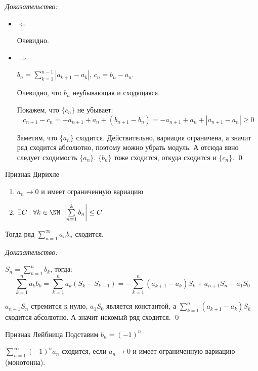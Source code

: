 \textit{Доказательство:}

\begin{itemize}
    \item
        \( \Leftarrow \)

        Очевидно.
    \item
        \( \Rightarrow \)

        \( b_n = \sum\limits_{k = 1}^{n - 1} | a_{k + 1} - a_k | \), \( c_n = b_n - a_n \).

        Очевидно, что \( b_n \) неубывающая и сходящаяся.

        Покажем, что \( \{ c_n \} \) не убывает:
        \[
            c_{n + 1} - c_n = -a_{n + 1} + a_n + (b_{n + 1} - b_n)
            =
            -a_{n + 1} + a_n + | a_{n + 1} - a_n | \geq 0
        \]

        Заметим, что \( \{ a_n \} \) сходится.
        Действительно, вариация ограничена, а значит ряд сходится абсолютно,
        поэтому можно убрать модуль. А отсюда явно следует сходимость \( \{ a_n \} \).
        \( \{ b_n \} \) тоже сходится, откуда сходится и \( \{ c_n \} \).
\qed
\end{itemize}

\begin{thrm}{Признак Дирихле}{}
    \begin{enumerate}
        \item
            \( a_n \to 0 \) и имеет ограниченную вариацию
        \item
            \( \exists C : \forall k \in \NN \ \left| \sum\limits_{n = 1}^{k} b_n \right| \leq C \)
    \end{enumerate}

    Тогда ряд \( \sum\limits_{n = 1}^{\infty} a_n b_n \) сходится.
\end{thrm}

\textit{Доказательство:}

\( S_n = \sum\limits_{k = 1}^{n} b_k \), тогда:
\[
    \sum\limits_{k = 1}^{n} a_k b_k
    =
    \sum\limits_{k = 1}^{n} a_k (S_k - S_{k - 1})
    =
    -\sum\limits_{k = 1}^{n} (a_{k + 1} - a_k) S_k + a_{n + 1} S_n - a_1 S_0
\]

\( a_{n + 1} S_n \) стремится к нулю, \( a_1 S_0 \) является константой,
а \( \sum\limits_{k = 1}^{n} (a_{k + 1} - a_k) S_k \) сходится абсолютно.
А значит искомый ряд сходится.
\qed

\begin{assrt}{Признак Лейбница}{}
    Подставим \( b_n = (-1)^n \)

    \( \sum\limits_{n = 1}^{\infty} (-1)^n a_n \) сходится,
    если \( a_n \to 0 \) и имеет ограниченную вариацию (монотонна).
\end{assrt}

